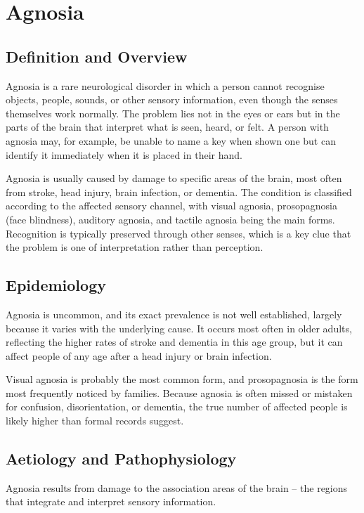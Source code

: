 \chapter{Agnosia}

\section*{Definition and Overview}
Agnosia is a rare neurological disorder in which a person cannot recognise objects, people, sounds, or other sensory information, even though the senses themselves work normally. The problem lies not in the eyes or ears but in the parts of the brain that interpret what is seen, heard, or felt. A person with agnosia may, for example, be unable to name a key when shown one but can identify it immediately when it is placed in their hand.

Agnosia is usually caused by damage to specific areas of the brain, most often from stroke, head injury, brain infection, or dementia. The condition is classified according to the affected sensory channel, with visual agnosia, prosopagnosia (face blindness), auditory agnosia, and tactile agnosia being the main forms. Recognition is typically preserved through other senses, which is a key clue that the problem is one of interpretation rather than perception.

\section*{Epidemiology}
Agnosia is uncommon, and its exact prevalence is not well established, largely because it varies with the underlying cause. It occurs most often in older adults, reflecting the higher rates of stroke and dementia in this age group, but it can affect people of any age after a head injury or brain infection.

Visual agnosia is probably the most common form, and prosopagnosia is the form most frequently noticed by families. Because agnosia is often missed or mistaken for confusion, disorientation, or dementia, the true number of affected people is likely higher than formal records suggest.

\section*{Aetiology and Pathophysiology}
Agnosia results from damage to the association areas of the brain -- the regions that integrate and interpret sensory information.

